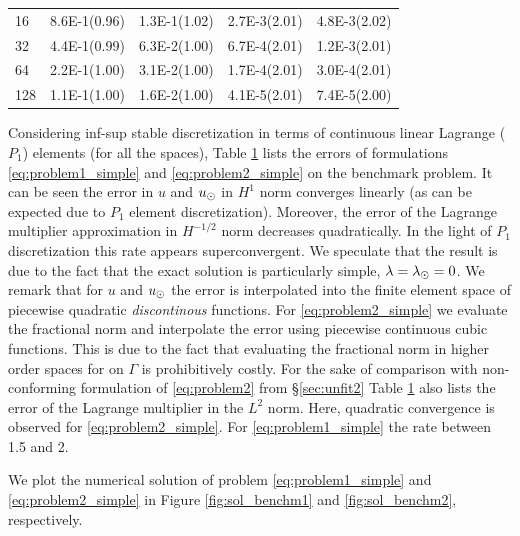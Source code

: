 \begin{table}
\begin{minipage}[b]{0.63\textwidth}
{\begin{center}
\begin{tabular}{l|llll}
16  & 8.6E-1(0.96) & 1.3E-1(1.02) & 2.7E-3(2.01) & 4.8E-3(2.02)\\
32  & 4.4E-1(0.99) & 6.3E-2(1.00) & 6.7E-4(2.01) & 1.2E-3(2.01)\\
64  & 2.2E-1(1.00) & 3.1E-2(1.00) & 1.7E-4(2.01) & 3.0E-4(2.01)\\
128 & 1.1E-1(1.00) & 1.6E-2(1.00) & 4.1E-5(2.01) & 7.4E-5(2.00)\\
\bottomrule
  \end{tabular}
  \end{center}
  }
  \label{tab:error_conform}
  \end{minipage}
\end{table}

Considering inf-sup stable discretization in terms of continuous linear Lagrange
($P_1$) elements (for all the spaces), Table \ref{tab:error_conform}
lists the errors of formulations \eqref{eq:problem1_simple} and \eqref{eq:problem2_simple}
on the benchmark problem. It can be seen the error in $u$ and $u_{\odot}$ in $H^1$ norm
converges linearly (as can be expected due to $P_1$ element discretization).
Moreover, the error of the Lagrange multiplier approximation in $H^{-1/2}$ norm
decreases quadratically. In the light of $P_1$ discretization this rate appears
superconvergent. We speculate that the result is due to the fact that the
exact solution is particularly simple, $\lambda=\lambda_{\odot}=0$.
We remark that for $u$ and $u_{\odot}$ the error is interpolated into the finite element space of
piecewise quadratic \emph{discontinous} functions. For \eqref{eq:problem2_simple} we
evaluate the fractional norm and interpolate the error using piecewise continuous
cubic functions. This is due to the fact that evaluating the fractional norm in higher order spaces
for on $\Gamma$ is prohibitively costly. For the sake of comparison with non-conforming formulation of \eqref{eq:problem2} from
\S\ref{sec:unfit2} Table \ref{tab:error_conform} also
lists the error of the Lagrange multiplier in the $L^2$ norm. Here, quadratic convergence is observed
for \eqref{eq:problem2_simple}. For \eqref{eq:problem1_simple} the rate between 1.5 and 2.

We plot the numerical solution of problem \eqref{eq:problem1_simple} and \eqref{eq:problem2_simple} in
Figure \ref{fig:sol_benchm1} and \ref{fig:sol_benchm2}, respectively.

